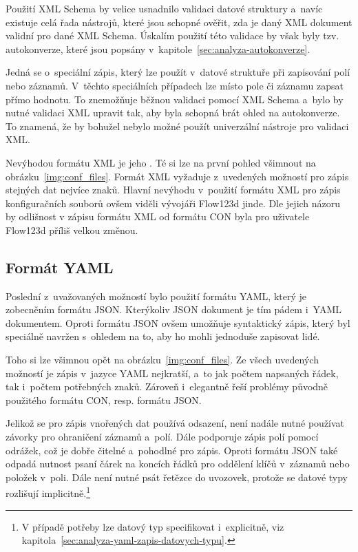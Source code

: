 \documentclass[FM,bw,DP]{tulthesis}
\begin{document}
Použití \gls{XML} Schema by velice usnadnilo validaci datové struktury a~navíc existuje celá řada nástrojů, které jsou schopné ověřit, zda je daný \gls{XML} dokument validní pro dané \gls{XML} Schema. Úskalím použití této validace by však byly tzv. autokonverze, které jsou popsány v~kapitole~\ref{sec:analyza-autokonverze}.

Jedná se o~speciální zápis, který lze použít v~datové struktuře při zapisování polí nebo záznamů. V~těchto speciálních případech lze místo pole či záznamu zapsat přímo hodnotu. To znemožňuje běžnou validaci pomocí XML Schema a~bylo by nutné validaci \gls{XML} upravit tak, aby byla schopná brát ohled na autokonverze. To znamená, že by bohužel nebylo možné použít univerzální nástroje pro validaci \gls{XML}.

Nevýhodou formátu \gls{XML} je jeho . Té si lze na první pohled všimnout na obrázku~\ref{img:conf_files}. Formát \gls{XML} vyžaduje z~uvedených možností pro zápis stejných dat nejvíce znaků. Hlavní nevýhodu v~použití formátu \gls{XML} pro zápis konfiguračních souborů ovšem viděli vývojáři Flow123d jinde. Dle jejich názoru by odlišnost v zápisu formátu \gls{XML} od formátu \gls{CON} byla pro uživatele Flow123d příliš velkou změnou.

\subsection{Formát YAML}
\label{sec:problematika-format-yaml}

Poslední z~uvažovaných možností bylo použití formátu \gls{YAML}, který je zobecněním formátu \gls{JSON}. Kterýkoliv \gls{JSON} dokument je tím pádem i~\gls{YAML} dokumentem. Oproti formátu \gls{JSON} ovšem umožňuje syntaktický zápis, který byl speciálně navržen s~ohledem na to, aby ho mohli jednoduše zapisovat lidé.

Toho si lze všimnou opět na obrázku~\ref{img:conf_files}. Ze všech uvedených možností je zápis v~jazyce YAML nejkratší, a~to jak počtem napsaných řádek, tak i~počtem potřebných znaků. Zároveň i~elegantně řeší problémy původně použitého formátu \gls{CON}, resp. formátu \gls{JSON}.

Jelikož se pro zápis vnořených dat používá odsazení, není nadále nutné používat závorky pro ohraničení záznamů a~polí. Dále podporuje zápis polí pomocí odrážek, což je dobře čitelné a~pohodlné pro zápis. Oproti formátu \gls{JSON} také odpadá nutnost psaní čárek na koncích řádků pro oddělení klíčů v~záznamů nebo položek v~poli. Dále není nutné psát řetězce do uvozovek, protože se datové typy rozlišují implicitně.\footnote{V případě potřeby lze datový typ specifikovat i~explicitně, viz kapitola~\ref{sec:analyza-yaml-zapis-datovych-typu}.}
\end{document}
